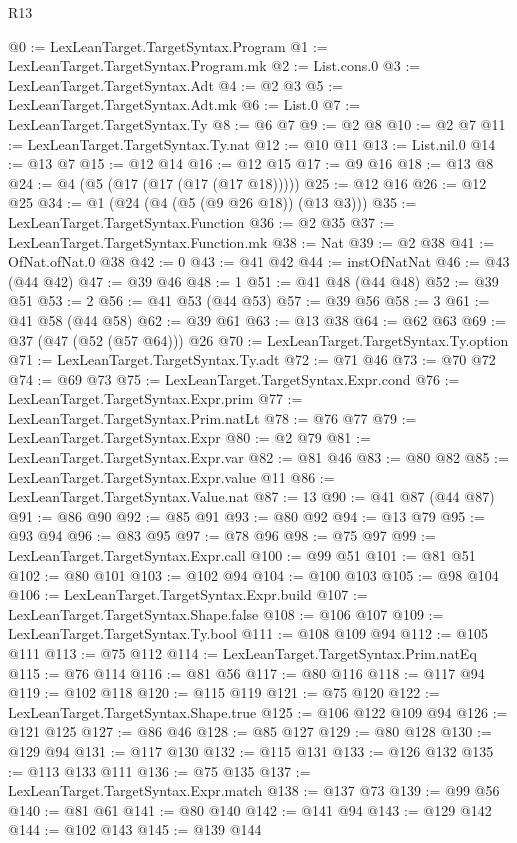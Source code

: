 \begin{lexlean}{R13}
\begin{coremodule}
@0 := LexLeanTarget.TargetSyntax.Program
@1 := LexLeanTarget.TargetSyntax.Program.mk
@2 := List.cons.{0}
@3 := LexLeanTarget.TargetSyntax.Adt
@4 := @2 @3
@5 := LexLeanTarget.TargetSyntax.Adt.mk
@6 := List.{0}
@7 := LexLeanTarget.TargetSyntax.Ty
@8 := @6 @7
@9 := @2 @8
@10 := @2 @7
@11 := LexLeanTarget.TargetSyntax.Ty.nat
@12 := @10 @11
@13 := List.nil.{0}
@14 := @13 @7
@15 := @12 @14
@16 := @12 @15
@17 := @9 @16
@18 := @13 @8
@24 := @4 (@5 (@17 (@17 (@17 (@17 @18)))))
@25 := @12 @16
@26 := @12 @25
@34 := @1 (@24 (@4 (@5 (@9 @26 @18)) (@13 @3)))
@35 := LexLeanTarget.TargetSyntax.Function
@36 := @2 @35
@37 := LexLeanTarget.TargetSyntax.Function.mk
@38 := Nat
@39 := @2 @38
@41 := OfNat.ofNat.{0} @38
@42 := 0
@43 := @41 @42
@44 := instOfNatNat
@46 := @43 (@44 @42)
@47 := @39 @46
@48 := 1
@51 := @41 @48 (@44 @48)
@52 := @39 @51
@53 := 2
@56 := @41 @53 (@44 @53)
@57 := @39 @56
@58 := 3
@61 := @41 @58 (@44 @58)
@62 := @39 @61
@63 := @13 @38
@64 := @62 @63
@69 := @37 (@47 (@52 (@57 @64))) @26
@70 := LexLeanTarget.TargetSyntax.Ty.option
@71 := LexLeanTarget.TargetSyntax.Ty.adt
@72 := @71 @46
@73 := @70 @72
@74 := @69 @73
@75 := LexLeanTarget.TargetSyntax.Expr.cond
@76 := LexLeanTarget.TargetSyntax.Expr.prim
@77 := LexLeanTarget.TargetSyntax.Prim.natLt
@78 := @76 @77
@79 := LexLeanTarget.TargetSyntax.Expr
@80 := @2 @79
@81 := LexLeanTarget.TargetSyntax.Expr.var
@82 := @81 @46
@83 := @80 @82
@85 := LexLeanTarget.TargetSyntax.Expr.value @11
@86 := LexLeanTarget.TargetSyntax.Value.nat
@87 := 13
@90 := @41 @87 (@44 @87)
@91 := @86 @90
@92 := @85 @91
@93 := @80 @92
@94 := @13 @79
@95 := @93 @94
@96 := @83 @95
@97 := @78 @96
@98 := @75 @97
@99 := LexLeanTarget.TargetSyntax.Expr.call
@100 := @99 @51
@101 := @81 @51
@102 := @80 @101
@103 := @102 @94
@104 := @100 @103
@105 := @98 @104
@106 := LexLeanTarget.TargetSyntax.Expr.build
@107 := LexLeanTarget.TargetSyntax.Shape.false
@108 := @106 @107
@109 := LexLeanTarget.TargetSyntax.Ty.bool
@111 := @108 @109 @94
@112 := @105 @111
@113 := @75 @112
@114 := LexLeanTarget.TargetSyntax.Prim.natEq
@115 := @76 @114
@116 := @81 @56
@117 := @80 @116
@118 := @117 @94
@119 := @102 @118
@120 := @115 @119
@121 := @75 @120
@122 := LexLeanTarget.TargetSyntax.Shape.true
@125 := @106 @122 @109 @94
@126 := @121 @125
@127 := @86 @46
@128 := @85 @127
@129 := @80 @128
@130 := @129 @94
@131 := @117 @130
@132 := @115 @131
@133 := @126 @132
@135 := @113 @133 @111
@136 := @75 @135
@137 := LexLeanTarget.TargetSyntax.Expr.match
@138 := @137 @73
@139 := @99 @56
@140 := @81 @61
@141 := @80 @140
@142 := @141 @94
@143 := @129 @142
@144 := @102 @143
@145 := @139 @144

\end{coremodule}
\end{lexlean}
